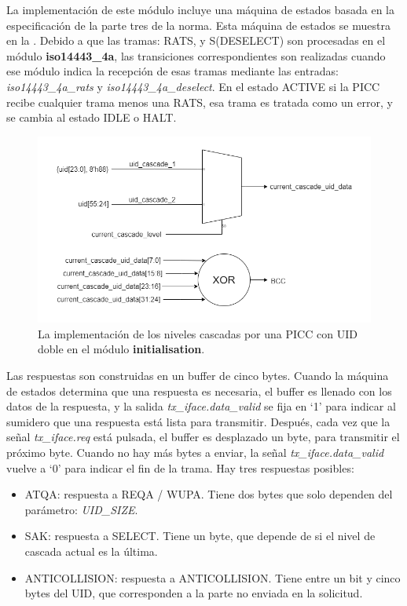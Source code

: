 \documentclass[a4paper, twoside, 11pt]{report}
\begin{document}
La implementación de este módulo incluye una máquina de estados basada en la especificación de la parte tres de la norma. Esta máquina de estados se muestra en la . Debido a que las tramas: RATS, y S(DESELECT) son procesadas en el módulo \textbf{iso14443\_4a}, las transiciones correspondientes son realizadas cuando ese módulo indica la recepción de esas tramas mediante las entradas: \textit{iso14443\_4a\_rats} y \textit{iso14443\_4a\_deselect}. En el estado ACTIVE si la PICC recibe cualquier trama menos una RATS, esa trama es tratada como un error, y se cambia al estado IDLE o HALT.

\begin{figure}[htb]
  \centering
  \includegraphics[width=1.0\textwidth]{./img/initialisation_uid.drawio}
  \caption{La implementación de los niveles cascadas por una PICC con UID doble en el módulo \textbf{initialisation}.}
  \label{fig:init_cascade_levels}
\end{figure}

Las respuestas son construidas en un buffer de cinco bytes. Cuando la máquina de estados determina que una respuesta es necesaria, el buffer es llenado con los datos de la respuesta,  y la salida \textit{tx\_iface.data\_valid} se fija en ‘1’ para indicar al sumidero que una respuesta está lista para transmitir. Después, cada vez que la señal \textit{tx\_iface.req} está pulsada, el buffer es desplazado un byte, para transmitir el próximo byte. Cuando no hay más bytes a enviar, la señal \textit{tx\_iface.data\_valid} vuelve a ‘0’ para indicar el fin de la trama. Hay tres respuestas posibles:

\begin{itemize}
  \item ATQA: respuesta a REQA / WUPA. Tiene dos bytes que solo dependen del parámetro: \textit{UID\_SIZE}.
  \item SAK: respuesta a SELECT. Tiene un byte, que depende de si el nivel de cascada actual es la última.
  \item ANTICOLLISION: respuesta a ANTICOLLISION. Tiene entre un bit y cinco bytes del UID, que corresponden a la parte no enviada en la solicitud.
\end{itemize}
\end{document}
